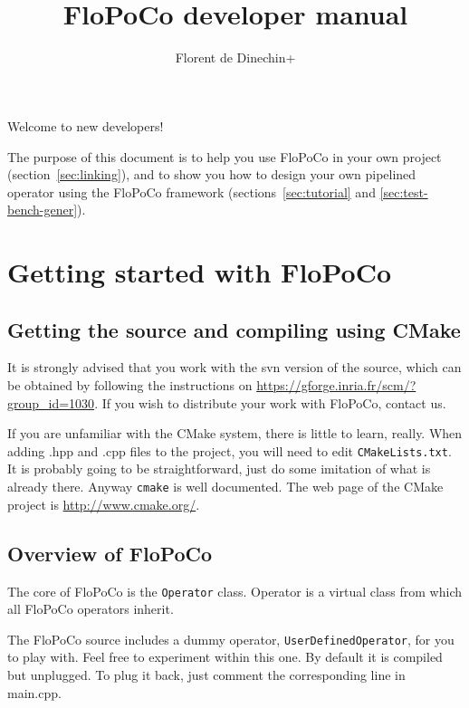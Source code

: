 \documentclass{article}
\title{\scalebox{0.3}{\mbox{}}\\
FloPoCo  developer manual
}
\author{Florent de Dinechin+}
\begin{document}
 
\sloppy



\maketitle


Welcome to new developers! 

The purpose of this document is to help you use FloPoCo in your own
project (section~\ref{sec:linking}), and to show you how to design your own pipelined operator
using the FloPoCo framework (sections~\ref{sec:tutorial} and \ref{sec:test-bench-gener}). 

\tableofcontents


 \section{Getting started with FloPoCo\label{sec:getting-started}}


\subsection{Getting the source and compiling using CMake}

It is strongly advised that you work with the svn version of the
source, which can be obtained by following the instructions on
\url{https://gforge.inria.fr/scm/?group_id=1030}. If you wish to
distribute your work with FloPoCo,  contact us.

If you are unfamiliar with the CMake system, there is little to learn,
really. When adding .hpp and .cpp files to the project, you will need
to edit \texttt{CMakeLists.txt}. It is probably going to be straightforward,
just do some imitation of what is already there. Anyway \texttt{cmake} is well
documented. The web page of the CMake project is \url{http://www.cmake.org/}.


\subsection{Overview of FloPoCo}

The core of FloPoCo is the \texttt{Operator} class. 
Operator is a virtual class from which all FloPoCo operators inherit. 

The FloPoCo source includes a dummy operator, \texttt{UserDefinedOperator}, for you to play with. 
Feel free to experiment within this one. 
By default it is compiled but unplugged. To plug it back, just comment the corresponding line in main.cpp.
\end{document}
